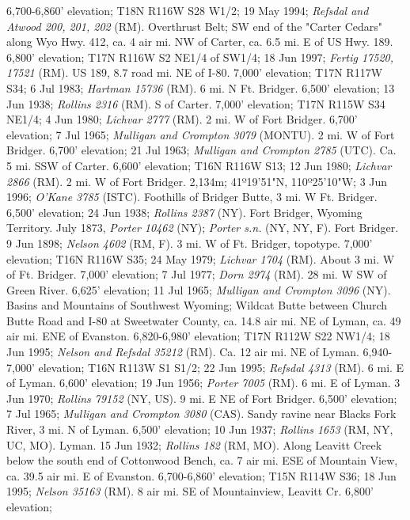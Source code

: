 6,700-6,860' elevation; T18N R116W S28 W1/2; 19 May 1994;
\textit{Refsdal and Atwood 200, 201, 202} (RM).
Overthrust Belt; SW end of the "Carter Cedars" along Wyo Hwy. 412,
ca. 4 air mi. NW of Carter, ca. 6.5 mi. E of US Hwy. 189. 6,800' elevation;
T17N R116W S2 NE1/4 of SW1/4; 18 Jun 1997; \textit{Fertig 17520, 17521} (RM).
US 189, 8.7 road mi. NE of I-80. 7,000' elevation; T17N R117W S34; 6 Jul 1983;
\textit{Hartman 15736} (RM).
6 mi. N Ft. Bridger. 6,500' elevation; 13 Jun 1938; \textit{Rollins 2316} (RM).
S of Carter. 7,000' elevation; T17N R115W S34 NE1/4; 4 Jun 1980;
\textit{Lichvar 2777} (RM).
2 mi. W of Fort Bridger. 6,700’ elevation; 7 Jul 1965;
\textit{Mulligan and Crompton 3079} (MONTU).
2 mi. W of Fort Bridger. 6,700’ elevation; 21 Jul 1963;
\textit{Mulligan and Crompton 2785} (UTC).
Ca. 5 mi. SSW of Carter. 6,600' elevation; T16N R116W S13; 12 Jun 1980;
\textit{Lichvar 2866} (RM).
2 mi. W of Fort Bridger. 2,134m; 41º19'51"N, 110º25'10"W; 3 Jun 1996;
\textit{O'Kane 3785} (ISTC).
Foothills of Bridger Butte, 3 mi. W Ft. Bridger. 6,500’ elevation; 24 Jun 1938;
\textit{Rollins 2387} (NY).
Fort Bridger, Wyoming Territory. July 1873, \textit{Porter 10462} (NY);
\textit{Porter s.n.} (NY, NY, F).
Fort Bridger. 9 Jun 1898; \textit{Nelson 4602} (RM, F).
3 mi. W of Ft. Bridger, topotype.	7,000' elevation; T16N R116W S35; 24 May 1979;
\textit{Lichvar 1704} (RM).
About 3 mi. W of Ft. Bridger. 7,000' elevation;	7 Jul 1977;
\textit{Dorn 2974} (RM).
28 mi. W SW of Green River. 6,625’ elevation; 11 Jul 1965;
\textit{Mulligan and Crompton 3096} (NY).
Basins and Mountains of Southwest Wyoming; Wildcat Butte between Church Butte
Road and I-80 at Sweetwater County, ca. 14.8 air mi. NE of Lyman, ca. 49 air mi.
ENE of Evanston.  6,820-6,980' elevation; T17N R112W S22 NW1/4; 18 Jun 1995;
\textit{Nelson and Refsdal 35212} (RM).
Ca. 12 air mi. NE of Lyman. 6,940-7,000' elevation; T16N R113W S1 S1/2;
22 Jun 1995; \textit{Refsdal 4313} (RM).
6 mi. E of Lyman. 6,600’ elevation; 19 Jun 1956; \textit{Porter 7005} (RM).
6 mi. E of Lyman. 3 Jun 1970; \textit{Rollins 79152} (NY, US).
9 mi. E NE of Fort Bridger. 6,500’ elevation; 7 Jul 1965;
\textit{Mulligan and Crompton 3080} (CAS).
Sandy ravine near Blacks Fork River, 3 mi. N of Lyman.	6,500' elevation;
10 Jun 1937; \textit{Rollins 1653} (RM, NY, UC, MO).
Lyman. 15 Jun 1932; \textit{Rollins 182} (RM, MO).
Along Leavitt Creek below the south end of Cottonwood Bench, ca. 7 air mi. ESE
of Mountain View, ca. 39.5 air mi. E of Evanston.	6,700-6,860' elevation;
T15N R114W S36; 18 Jun 1995; \textit{Nelson 35163} (RM).
8 air mi. SE of Mountainview, Leavitt Cr. 6,800' elevation;
